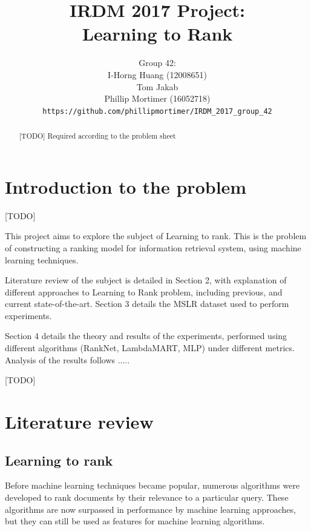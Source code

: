 \documentclass[english]{article}
\theoremstyle{definition}
\begin{document}
\title{IRDM 2017 Project:\\Learning to Rank
}
\author{Group 42:\\
I-Horng Huang (12008651) \\
Tom Jakab\\
Phillip Mortimer (16052718)\\
\texttt{https://github.com/phillipmortimer/IRDM\_2017\_group\_42}}
\maketitle


\begin{abstract}
[TODO]
Required according to the problem sheet

\end{abstract}
\begin{multicols}{2}
\section{Introduction to the problem}
[TODO]


This project aims to explore the subject of Learning to rank. This is the problem of constructing a ranking model for information retrieval system, using machine learning techniques. 

Literature review of the subject is detailed in Section 2, with explanation of different approaches to Learning to Rank problem, including previous, and current state-of-the-art. Section 3 details the MSLR dataset used to perform experiments. 

Section 4 details the theory and results of the experiments, performed using different algorithms (RankNet, LambdaMART, MLP) under different metrics. Analysis of the results follows ..... 

[TODO]



\section{Literature review}

\subsection{Learning to rank}

Before machine learning techniques became popular, numerous algorithms were developed to rank documents by their relevance to a particular query.  These algorithms are now surpassed in performance by machine learning approaches, but they can still be used as features for machine learning algorithms. 


\end{multicols}
\end{document}
